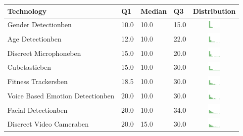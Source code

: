 \begin{table}[t]
\begin{center}
\small
\begin{tabular}{| p{2cm} | p{1cm} | p{1cm} | p{1cm} | c |}
\hline
Technology & Q1 &  Median & Q3 & Distribution  \\ 
\hline
Gender Detectionben & 10.0 & 10.0 & 15.0 & \includegraphics[width = 2cm, height = 0.5cm]{tables/genderdetectionben} \\ 
Age Detectionben & 12.0 & 10.0 & 22.0 & \includegraphics[width = 2cm, height = 0.5cm]{tables/agedetectionben} \\ 
Discreet Microphoneben & 15.0 & 10.0 & 20.0 & \includegraphics[width = 2cm, height = 0.5cm]{tables/discreetmicrophoneben} \\ 
Cubetasticben & 15.0 & 10.0 & 30.0 & \includegraphics[width = 2cm, height = 0.5cm]{tables/cubetasticben} \\ 
Fitness Trackersben & 18.5 & 10.0 & 30.0 & \includegraphics[width = 2cm, height = 0.5cm]{tables/fitnesstrackersben} \\ 
Voice Based Emotion Detectionben & 20.0 & 10.0 & 30.0 & \includegraphics[width = 2cm, height = 0.5cm]{tables/voicebasedemotiondetectionben} \\ 
Facial Detectionben & 20.0 & 10.0 & 34.0 & \includegraphics[width = 2cm, height = 0.5cm]{tables/facialdetectionben} \\ 
Discreet Video Cameraben & 20.0 & 15.0 & 30.0 & \includegraphics[width = 2cm, height = 0.5cm]{tables/discreetvideocameraben} \\ 

\end{tabular}
\end{center}
\end{table}
